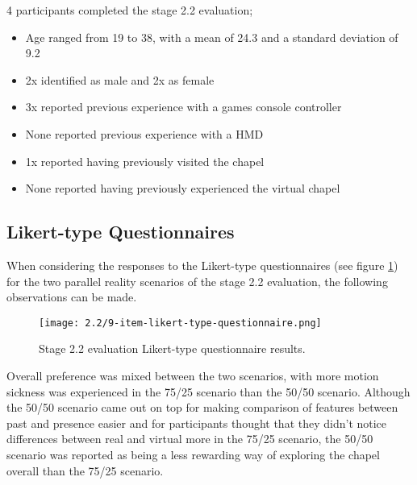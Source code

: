 4 participants completed the stage 2.2 evaluation;
\begin{itemize}
	\item Age ranged from 19 to 38, with a mean of 24.3 and a standard deviation of 9.2
	\item 2x identified as male and 2x as female
	\item 3x reported previous experience with a games console controller
	\item None reported previous experience with a HMD
	\item 1x reported having previously visited the chapel
	\item None reported having previously experienced the virtual chapel
\end{itemize}


\subsection{Likert-type Questionnaires}

When considering the responses to the Likert-type questionnaires (see figure \ref{9-item-likert-type-questionnaire.png}) for the two parallel reality scenarios of the stage 2.2 evaluation, the following observations can be made.

\begin{figure}[h]
	\begin{center}
	\texttt{[image: 2.2/9-item-likert-type-questionnaire.png]}
	\caption{Stage 2.2 evaluation Likert-type questionnaire results.}
	\label{9-item-likert-type-questionnaire.png}
	\end{center}
\end{figure}

Overall preference was mixed between the two scenarios, with more motion sickness was experienced in the 75/25 scenario than the 50/50 scenario. Although the 50/50 scenario came out on top for making comparison of features between past and presence easier and for participants thought that they didn't notice differences between real and virtual more in the 75/25 scenario, the 50/50 scenario was reported as being a less rewarding way of exploring the chapel overall than the 75/25 scenario.


